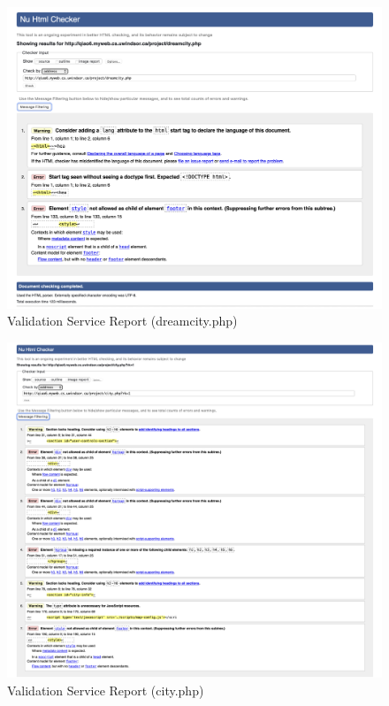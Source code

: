 \documentclass[12pt, letterpaper]{article}
\begin{document}
 \begin{figure}[htbp]
	\centering
	\includegraphics[width=\textwidth]{images/27-report-3.png}
	\caption{Validation Service Report (dreamcity.php)}
 \end{figure}

 \begin{figure}[htbp]
	\centering
	\includegraphics[width=\textwidth]{images/27-report-4.png}
	\caption{Validation Service Report (city.php)}
 \end{figure}
\end{document}
